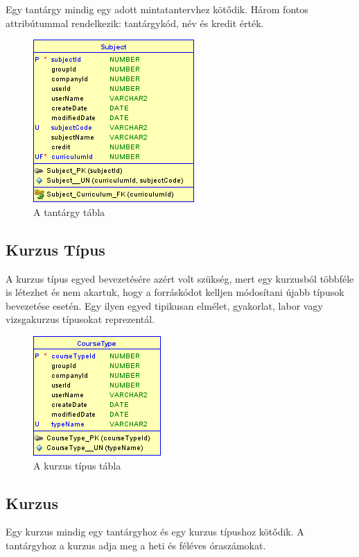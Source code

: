\documentclass[hidelinks, 12pt, a4paper]{report}
\begin{document}
Egy tantárgy mindig egy adott mintatantervhez kötődik. Három fontos attribútummal rendelkezik: tantárgykód, név és kredit érték.

\begin{figure}[H]
    \centering
	\includegraphics{subject.png}
	\caption{A tantárgy tábla}
\end{figure}

\subsection{Kurzus Típus}

A kurzus típus egyed bevezetésére azért volt szükség, mert egy kurzusból többféle is létezhet és nem akartuk, hogy a forráskódot kelljen módosítani újabb típusok bevezetése esetén. Egy ilyen egyed tipikusan elmélet, gyakorlat, labor vagy vizsgakurzus típusokat reprezentál.

\begin{figure}[H]
    \centering
	\includegraphics{course_type.png}
	\caption{A kurzus típus tábla}
\end{figure}

\subsection{Kurzus}

Egy kurzus mindig egy tantárgyhoz és egy kurzus típushoz kötődik. A tantárgyhoz a kurzus adja meg a heti és féléves óraszámokat.
\end{document}
